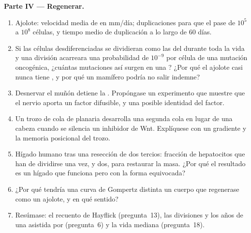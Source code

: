\begin{problem}
\medskip
\noindent\textbf{Parte IV --- Regenerar.}
\begin{enumerate}[resume]
  \item Ajolote: velocidad media de  en mm/día;
        duplicaciones para que el  pase de $10^{5}$ a $10^{8}$
        células, y tiempo medio de duplicación a lo largo de 60 días.
  \item Si las células desdiferenciadas se dividieran como las del
         durante toda la vida y una división acarreara una
        probabilidad de $10^{-9}$ por célula de una mutación oncogénica,
        ¿cuántas mutaciones así surgen en una ? ¿Por qué el
        ajolote casi nunca tiene , y por qué un mamífero podría no
        salir indemne?
  \item Desnervar el muñón detiene la . Propóngase un
        experimento que muestre que el nervio aporta un factor
        difusible, y una posible identidad del factor.
  \item Un trozo de cola de planaria desarrolla una segunda cola en
        lugar de una cabeza cuando se silencia un inhibidor de Wnt.
        Explíquese con un gradiente y la memoria posicional del trozo.
  \item Hígado humano tras una resección de dos tercios: fracción de
        hepatocitos que han de dividirse una vez, y dos, para restaurar
        la masa. ¿Por qué el resultado es un hígado que funciona pero
        con la forma equivocada?
  \item ¿Por qué tendría una curva de Gompertz distinta un cuerpo que
        regenerase como un ajolote, y en qué sentido?
  \item Resúmase: el recuento de Hayflick (pregunta~13), las divisiones
        y los años de una  asistida por 
        (pregunta~6) y la vida mediana (pregunta~18).
\end{enumerate}
\end{problem}

